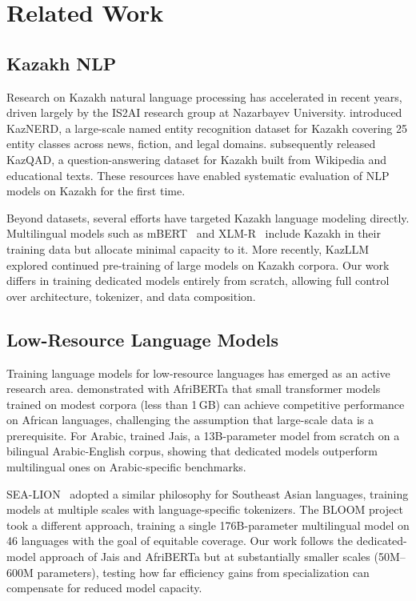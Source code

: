 \section{Related Work}
\label{sec:related}

\subsection{Kazakh NLP}

Research on Kazakh natural language processing has accelerated in
recent years, driven largely by the IS2AI research group at Nazarbayev
University.  \citet{yeshpanov2022kaznerd} introduced KazNERD, a
large-scale named entity recognition dataset for Kazakh covering 25
entity classes across news, fiction, and legal domains.
\citet{yeshpanov2024kazqad} subsequently released KazQAD, a
question-answering dataset for Kazakh built from Wikipedia and
educational texts.  These resources have enabled systematic evaluation
of NLP models on Kazakh for the first time.

Beyond datasets, several efforts have targeted Kazakh language
modeling directly.  Multilingual models such as
mBERT~\citep{devlin2019bert} and XLM-R~\citep{conneau2020xlmr}
include Kazakh in their training data but allocate minimal capacity to
it.  More recently, KazLLM~\citep{kazllm2024} explored continued
pre-training of large models on Kazakh corpora.  Our work differs in
training dedicated models entirely from scratch, allowing full control
over architecture, tokenizer, and data composition.

\subsection{Low-Resource Language Models}

Training language models for low-resource languages has emerged as an
active research area.  \citet{ogueji2021afriberta} demonstrated with
AfriBERTa that small transformer models trained on modest corpora
(less than 1\,GB) can achieve competitive performance on African
languages, challenging the assumption that large-scale data is a
prerequisite.  For Arabic, \citet{sengupta2023jais} trained Jais, a
13B-parameter model from scratch on a bilingual Arabic-English corpus,
showing that dedicated models outperform multilingual ones on
Arabic-specific benchmarks.

SEA-LION~\citep{sealion2023} adopted a similar philosophy for
Southeast Asian languages, training models at multiple scales with
language-specific tokenizers.  The BLOOM
project~\citep{bigscience2022bloom} took a different approach,
training a single 176B-parameter multilingual model on 46 languages
with the goal of equitable coverage.  Our work follows the
dedicated-model approach of Jais and AfriBERTa but at substantially
smaller scales (50M--600M parameters), testing how far efficiency
gains from specialization can compensate for reduced model capacity.


